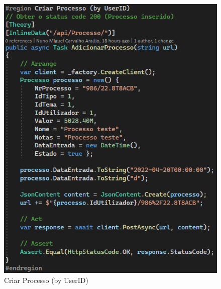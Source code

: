\begin{figure}[!htbp]
  \centering
  \begin{minipage}[b]{0.4\textwidth}
    \includegraphics[width=\textwidth]{Figuras/TestesUnitarios/Processo/Criar Processo (by UserID).png}
    \caption{Criar Processo (by UserID)}
    \label{d.unitario}
  \end{minipage}
  \hfill
  \begin{minipage}[b]{0.4\textwidth}

\end{minipage}
\end{figure}

